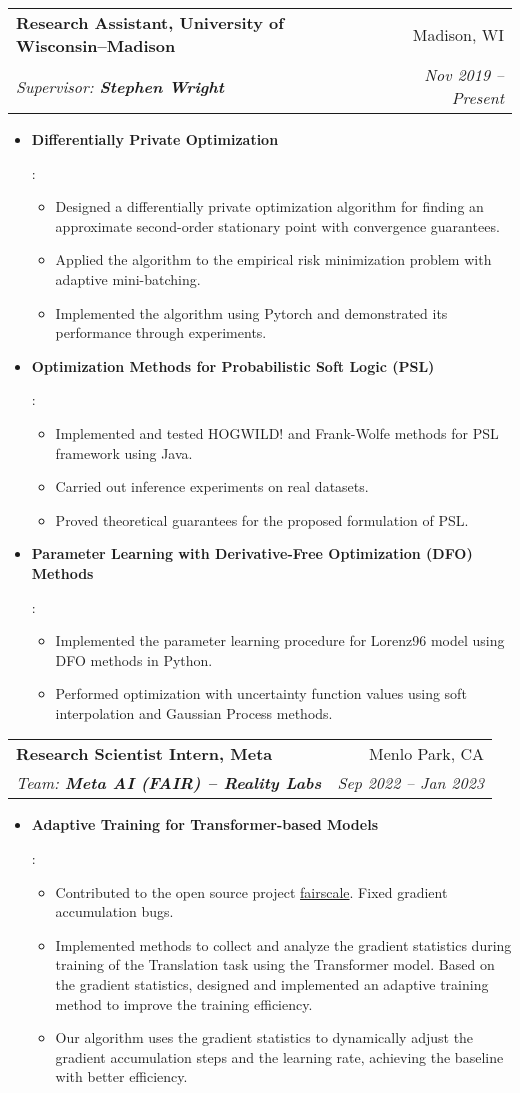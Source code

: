 \documentclass[letterpaper,12pt]{article}
\makeatletter
\newcommand{\resumeItem}[2]{
  \item\small{
    \textbf{#1}{: #2 \vspace{-2pt}}
  }
}
\newcommand{\resumeSubheading}[4]{
  \vspace{-1pt}\item
    \begin{tabular*}{0.97\textwidth}[t]{l@{\extracolsep{\fill}}r}
      \textbf{#1} & #2 \\
      \textit{\small#3} & \textit{\small #4} \\
    \end{tabular*}\vspace{-5pt}
}
\newcommand{\resumeItemListStart}{\begin{itemize}}
\newcommand{\resumeItemListEnd}{\end{itemize}\vspace{-5pt}}
\makeatother
\begin{document}
\resumeSubheading
{Research Assistant, University of Wisconsin--Madison}{Madison, WI}
{Supervisor: \textup{\textbf{Stephen Wright}}}{Nov 2019 -- Present}
\resumeItemListStart
\resumeItem{Differentially Private Optimization}{
  \begin{itemize}
    \item Designed a differentially private optimization algorithm for finding an approximate second-order stationary point with convergence guarantees.
    \item Applied the algorithm to the empirical risk minimization problem with adaptive mini-batching.
    \item Implemented the algorithm using Pytorch and demonstrated its performance through experiments.
  \end{itemize}
}

\resumeItem{Optimization Methods for Probabilistic Soft Logic (PSL)}{
  \begin{itemize}
    \item Implemented and tested HOGWILD! and Frank-Wolfe methods for PSL framework using Java.
    \item Carried out inference experiments on real datasets.
    \item Proved theoretical guarantees for the proposed formulation of PSL.
  \end{itemize}
}

\resumeItem{Parameter Learning with Derivative-Free Optimization (DFO) Methods}{
  \begin{itemize}
    \item Implemented the parameter learning procedure for Lorenz96 model using DFO methods in Python.
    \item Performed optimization with uncertainty function values using soft interpolation and Gaussian Process methods.
  \end{itemize}
} 
\resumeItemListEnd

\resumeSubheading {Research Scientist Intern, Meta}{Menlo Park, CA}
{Team: \textup{\textbf{Meta AI (FAIR) -- Reality Labs}}}{Sep 2022 -- Jan 2023}
\resumeItemListStart
\resumeItem{Adaptive Training for Transformer-based Models}{
  \begin{itemize}
    \item Contributed to the open source project \href{https://github.com/facebookresearch/fairscale}{fairscale}.
    Fixed gradient accumulation bugs.
    \item Implemented methods to collect and analyze the gradient statistics during training of the Translation task using the Transformer model.
    Based on the gradient statistics, designed and implemented an adaptive training method to improve the training efficiency.
    \item Our algorithm uses the gradient statistics to dynamically adjust the gradient accumulation steps and the learning rate, achieving the baseline with better efficiency.
  \end{itemize}
}
\resumeItemListEnd
\end{document}
